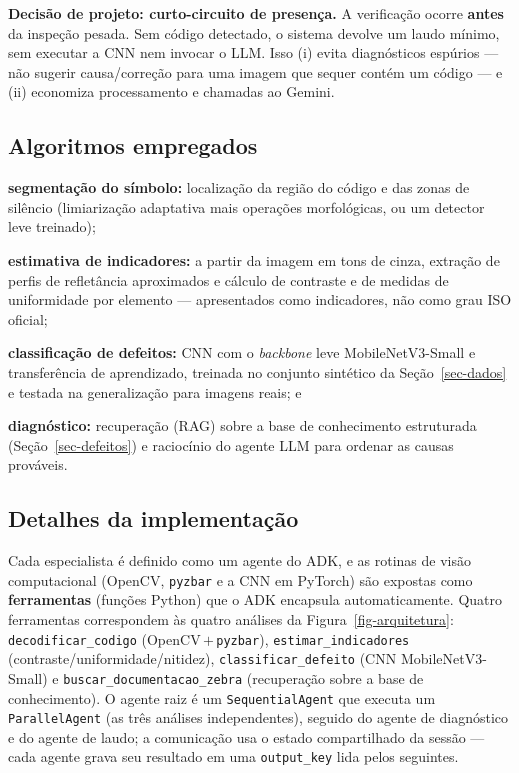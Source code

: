 \documentclass[
	article,			%
	11pt,				%
	oneside,			%
	a4paper,			%
	english,			%
	brazilian,			%
	sumario=tradicional
	]{abntex2}
\begin{document}
\noindent\textbf{Decisão de projeto: curto-circuito de presença.} A verificação
ocorre \textbf{antes} da inspeção pesada. Sem código detectado, o sistema devolve
um laudo mínimo, sem executar a CNN nem invocar o LLM. Isso (i) evita diagnósticos
espúrios --- não sugerir causa/correção para uma imagem que sequer contém um código
--- e (ii) economiza processamento e chamadas ao Gemini.

\subsection{Algoritmos empregados}

\begin{alineas}
	\item \textbf{segmentação do símbolo:} localização da região do código e das
	zonas de silêncio (limiarização adaptativa mais operações morfológicas, ou um
	detector leve treinado);
	\item \textbf{estimativa de indicadores:} a partir da imagem em tons de cinza,
	extração de perfis de refletância aproximados e cálculo de contraste e de
	medidas de uniformidade por elemento --- apresentados como indicadores, não
	como grau ISO oficial;
	\item \textbf{classificação de defeitos:} CNN com o \textit{backbone} leve
	MobileNetV3-Small e transferência de aprendizado, treinada
	no conjunto sintético da Seção~\ref{sec-dados} e testada na generalização para
	imagens reais; e
	\item \textbf{diagnóstico:} recuperação (RAG) sobre a base de conhecimento
	estruturada (Seção~\ref{sec-defeitos}) e raciocínio do agente LLM para ordenar
	as causas prováveis.
\end{alineas}

\subsection{Detalhes da implementação}

Cada especialista é definido como um agente do ADK, e as rotinas de visão
computacional (OpenCV, \texttt{pyzbar} e a CNN em PyTorch) são expostas como
\textbf{ferramentas} (funções Python) que o ADK encapsula automaticamente. Quatro
ferramentas correspondem às quatro análises da Figura~\ref{fig-arquitetura}:
\texttt{decodificar\_codigo} (OpenCV\,$+$\,\texttt{pyzbar}),
\texttt{estimar\_indicadores} (contraste/uniformidade/nitidez),
\texttt{classificar\_defeito} (CNN MobileNetV3-Small) e
\texttt{buscar\_documentacao\_zebra} (recuperação sobre a base de conhecimento). O
agente raiz é um \texttt{SequentialAgent} que executa um \texttt{ParallelAgent} (as
três análises independentes), seguido do agente de diagnóstico e do agente de laudo;
a comunicação usa o estado compartilhado da sessão --- cada agente grava seu
resultado em uma \texttt{output\_key} lida pelos seguintes.
\end{document}
